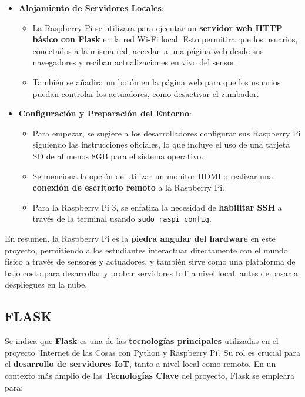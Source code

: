 \documentclass{report}
\begin{document}
\begin{itemize}
    \item \textbf{Alojamiento de Servidores Locales}:
    \begin{itemize}
        \item La Raspberry Pi se utilizara para ejecutar un \textbf{servidor web HTTP básico con Flask} en la red Wi-Fi local. Esto 
        permitira que los usuarios, conectados a la misma red, accedan a una página web desde sus navegadores y reciban actualizaciones 
        en vivo del sensor.
        \item También se añadira un botón en la página web para que los usuarios puedan controlar los actuadores, como desactivar el zumbador.
    \end{itemize}

    \item \textbf{Configuración y Preparación del Entorno}:
    \begin{itemize}
        \item Para empezar, se sugiere a los desarrolladores configurar sus Raspberry Pi siguiendo las instrucciones oficiales, lo que 
        incluye el uso de una tarjeta SD de al menos 8GB para el sistema operativo.
        \item Se menciona la opción de utilizar un monitor HDMI o realizar una \textbf{conexión de escritorio remoto} a la Raspberry Pi.
        \item Para la Raspberry Pi 3, se enfatiza la necesidad de \textbf{habilitar SSH} a través de la terminal usando \verb|sudo raspi_config|.
    \end{itemize}
\end{itemize}
En resumen, la Raspberry Pi es la \textbf{piedra angular del hardware} en este proyecto, permitiendo a los estudiantes interactuar 
directamente con el mundo físico a través de sensores y actuadores, y también sirve como una plataforma de bajo costo para desarrollar 
y probar servidores IoT a nivel local, antes de pasar a despliegues en la nube.

\subsection{FLASK}
Se indica que \textbf{Flask} \cite{flask} es una de las \textbf{tecnologías principales} utilizadas en el proyecto 
'Internet de las Cosas con Python y Raspberry Pi'. Su rol es crucial para el \textbf{desarrollo de servidores IoT}, tanto a nivel local 
como remoto. 
En un contexto más amplio de las \textbf{Tecnologías Clave} del proyecto, Flask se empleara para:
\end{document}
